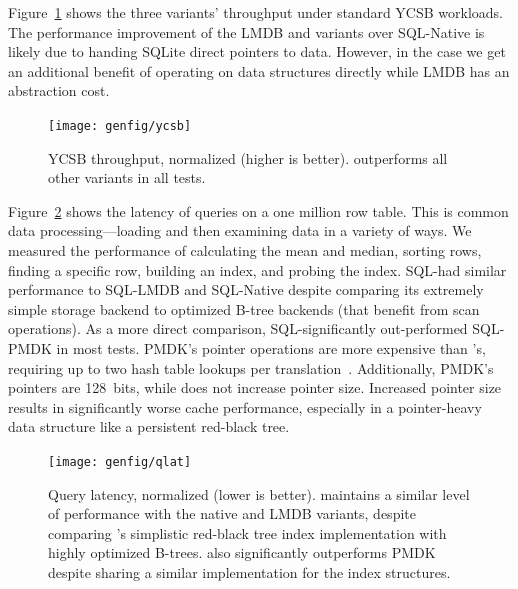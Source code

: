 {    Figure~\ref{fig:ycsb} shows the three variants' throughput under standard YCSB
    workloads. The performance improvement of the LMDB and \Twizzler variants over SQL-Native is
    likely due to handing SQLite direct pointers to data. However, in the \Twizzler
    case we get an additional benefit of operating on data structures directly while LMDB has an
    abstraction cost.

    \begin{figure}[t]
        \centering
        \texttt{[image: genfig/ycsb]}
        \caption{YCSB throughput, normalized (higher is better). \Twizzler outperforms all other
            variants in all tests.}
        \label{fig:ycsb}
    \end{figure}

    Figure~\ref{fig:qlat} shows the latency of queries on a one million row table.
    This is common data processing---loading and then
    examining data in a variety of ways.
    We measured the performance
    of calculating the mean and median, sorting rows, finding a specific row,
    building an index, and probing the index. SQL-\Twizzler had similar performance to SQL-LMDB and
    SQL-Native despite comparing its extremely simple storage backend to optimized B-tree
    backends (that benefit from scan operations). As a more direct comparison,
    SQL-\Twizzler significantly out-performed SQL-PMDK in most tests. PMDK's pointer operations are
    more expensive than \Twizzler's, requiring up to two hash table lookups per
    translation~\cite{pmdk-pointers}. Additionally, PMDK's
    pointers are 128~bits, while \Twizzler does not increase pointer size. Increased
    pointer size results in significantly worse cache performance, especially in a pointer-heavy data
    structure like a persistent red-black tree.



    \begin{figure}[t]
        \centering
        \texttt{[image: genfig/qlat]}
        \caption{Query latency, normalized (lower is better). \Twizzler maintains a similar level of
            performance with the native and LMDB variants, despite comparing \Twizzler's simplistic
            red-black tree index
            implementation with highly optimized B-trees. \Twizzler also significantly outperforms PMDK
            despite sharing a similar implementation for the index structures.}
        \label{fig:qlat}
    \end{figure}


}
